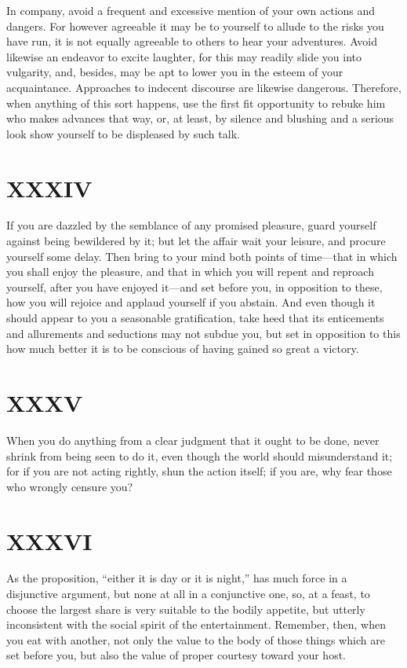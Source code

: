 \documentclass[11pt]{article}
\begin{document}
In company, avoid a frequent and excessive mention of your own actions and dangers. For however agreeable it may be to yourself to allude to the risks you have run, it is not equally agreeable to others to hear your adventures. Avoid likewise an endeavor to excite laughter, for this may readily slide you into vulgarity, and, besides, may be apt to lower you in the esteem of your acquaintance. Approaches to indecent discourse are likewise dangerous. Therefore, when anything of this sort happens, use the first fit opportunity to rebuke him who makes advances that way, or, at least, by silence and blushing and a serious look show yourself to be displeased by such talk.
\section*{XXXIV}

If you are dazzled by the semblance of any promised pleasure, guard yourself against being bewildered by it; but let the affair wait your leisure, and procure yourself some delay. Then bring to your mind both points of time—that in which you shall enjoy the pleasure, and that in which you will repent and reproach yourself, after you have enjoyed it—and set before you, in opposition to these, how you will rejoice and applaud yourself if you abstain. And even though it should appear to you a seasonable gratification, take heed that its enticements and allurements and seductions may not subdue you, but set in opposition to this how much better it is to be conscious of having gained so great a victory.
\section*{XXXV}

When you do anything from a clear judgment that it ought to be done, never shrink from being seen to do it, even though the world should misunderstand it; for if you are not acting rightly, shun the action itself; if you are, why fear those who wrongly censure you?
\section*{XXXVI}

As the proposition, “either it is day or it is night,” has much force in a disjunctive argument, but none at all in a conjunctive one, so, at a feast, to choose the largest share is very suitable to the bodily appetite, but utterly inconsistent with the social spirit of the entertainment. Remember, then, when you eat with another, not only the value to the body of those things which are set before you, but also the value of proper courtesy toward your host.
\end{document}
